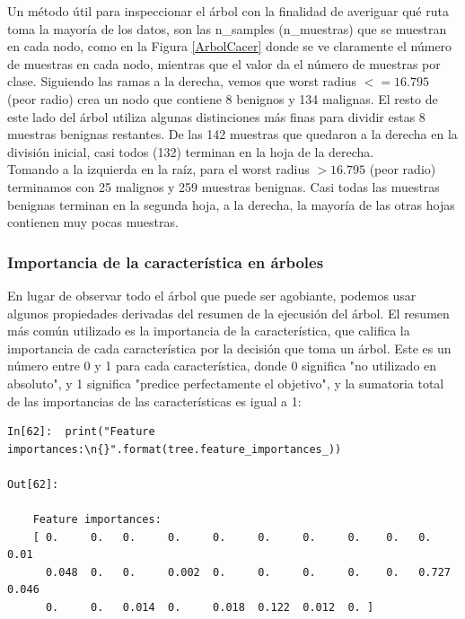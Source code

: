 {Un método  útil  para inspeccionar el árbol  con la finalidad  de averiguar qué ruta toma la mayoría de los datos, son las  {\ttfamily n\_samples}  (n\_muestras) que se muestran en cada nodo, como en la Figura \ref{ArbolCacer}  donde se ve claramente el  número de muestras en cada nodo, mientras que el valor da el número de muestras por clase. Siguiendo las ramas a la derecha, vemos que  worst radius $<=16.795$ (peor radio)  crea un nodo que contiene  8 benignos y 134  malignas.  El resto de este lado del árbol utiliza algunas distinciones más finas para dividir estas 8 muestras benignas restantes.   De las 142 muestras que quedaron  a la derecha en la división inicial, casi todos (132) terminan en la hoja de la derecha.\\

Tomando  a la izquierda en la raíz, para el worst radius $> 16.795$ (peor radio) terminamos con 25 malignos
y 259 muestras benignas. Casi todas las muestras benignas terminan en la segunda hoja, 
a la derecha, la mayoría de las otras hojas  contienen muy pocas muestras.\\


\subsubsection{Importancia de la característica en árboles} \label{ImpotCaract}

 En lugar de observar todo el árbol  que puede ser  agobiante,  podemos usar algunos propiedades 
 derivadas del resumen  de la ejecusión del árbol. El  resumen más común  utilizado es la importancia de la característica, que califica la importancia de cada característica por la decisión que toma un árbol.  Este es un número entre 0 y 1 para cada característica, donde 0 significa  "{}no utilizado en absoluto"{},  y 1 significa  "{}predice perfectamente el objetivo"{}, y la sumatoria  total de las importancias  de las características  es igual a 1:\\
  
\begin{lstlisting}
In[62]:  print("Feature importances:\n{}".format(tree.feature_importances_))

Out[62]:

    Feature importances:
    [ 0.     0.   0.     0.     0.     0.     0.     0.    0.   0.     0.01
      0.048  0.   0.     0.002  0.     0.     0.     0.    0.   0.727  0.046
      0.     0.   0.014  0.     0.018  0.122  0.012  0. ]
\end{lstlisting}


}
